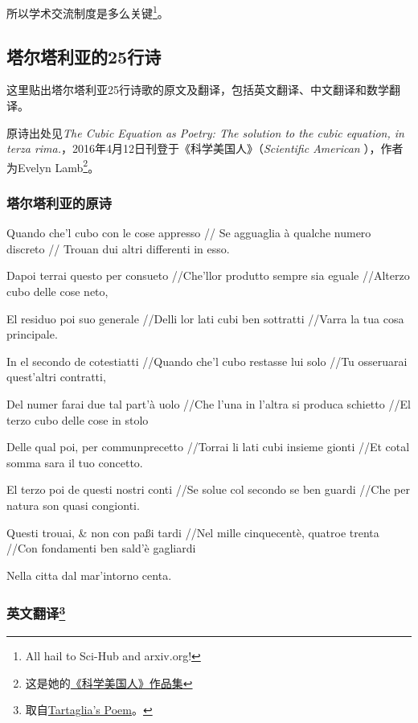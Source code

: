 所以学术交流制度是多么关键\footnote{All hail to Sci-Hub and arxiv.org! }。


\subsection{塔尔塔利亚的25行诗}\label{sub_PlyRtS_2}

这里贴出塔尔塔利亚25行诗歌的原文及翻译，包括英文翻译、中文翻译和数学翻译。

原诗出处见\textsl{The Cubic Equation as Poetry:
The solution to the cubic equation, in terza rima.}，2016年4月12日刊登于《科学美国人》（\textsl{Scientific American} ），作者为Evelyn Lamb\footnote{这是她的\href{https://www.scientificamerican.com/author/evelyn-lamb/}{《科学美国人》作品集}}。



\subsubsection{塔尔塔利亚的原诗}

Quando che'l cubo con le cose appresso 
//
Se agguaglia à qualche numero discreto
//
Trouan dui altri differenti in esso.



Dapoi terrai questo per consueto
​//Che'llor produtto sempre sia eguale
//​Alterzo cubo delle cose neto,
 

El residuo poi suo generale 
//Delli lor lati cubi ben sottratti
//​Varra la tua cosa principale.
 

In el secondo de cotestiatti 
​//Quando che'l cubo restasse lui solo 
//Tu osseruarai quest'altri contratti,
 

Del numer farai due tal part'à uolo 
//Che l'una in l'altra si produca schietto
//El terzo cubo delle cose in stolo
​

Delle qual poi, per communprecetto 
​//Torrai li lati cubi insieme gionti 
//Et cotal somma sara il tuo concetto.
 

El terzo poi de questi nostri conti 
//Se solue col secondo se ben guardi 
//Che per natura son quasi congionti.
 

Questi trouai, \& non con paßi tardi 
//Nel mille cinquecentè, quatroe trenta 
//Con fondamenti ben sald'è gagliardi
​

Nella citta dal mar'intorno centa.


\subsubsection{英文翻译\footnote{取自\href{https://www.maa.org/press/periodicals/convergence/how-tartaglia-solved-the-cubic-equation-tartaglias-poem。}{Tartaglia's Poem}。}}

